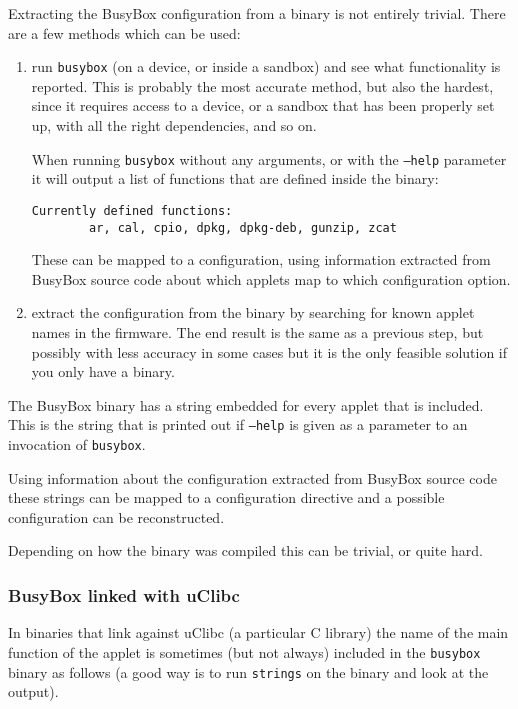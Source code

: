 \documentclass[10pt,a4paper]{article}
\begin{document}
Extracting the BusyBox configuration from a binary is not entirely trivial.
There are a few methods which can be used:

\begin{enumerate}
\item run \texttt{busybox} (on a device, or inside a sandbox) and see what
functionality is reported. This is probably the most accurate method, but also
the hardest, since it requires access to a device, or a sandbox that has been
properly set up, with all the right dependencies, and so on.

When running \texttt{busybox} without any arguments, or with the \texttt{--help}
parameter it will output a list of functions that are defined inside the
binary:

\begin{verbatim}
Currently defined functions:
        ar, cal, cpio, dpkg, dpkg-deb, gunzip, zcat
\end{verbatim}

These can be mapped to a configuration, using information extracted from
BusyBox source code about which applets map to which configuration option.
\item extract the configuration from the binary by searching for known applet
names in the firmware. The end result is the same as a previous step, but
possibly with less accuracy in some cases but it is the only feasible solution
if you only have a binary.
\end{enumerate}

The BusyBox binary has a string embedded for every applet that is included.
This is the string that is printed out if \texttt{--help} is given as a
parameter to an invocation of \texttt{busybox}.

Using information about the configuration extracted from BusyBox source code
these strings can be mapped to a configuration directive and a possible
configuration can be reconstructed.

Depending on how the binary was compiled this can be trivial, or quite hard.

\subsubsection{BusyBox linked with uClibc}

In binaries that link against uClibc (a particular C library) the name of the
main function of the applet is sometimes (but not always) included in the
\texttt{busybox} binary as follows (a good way is to run \texttt{strings} on
the binary and look at the output).
\end{document}
